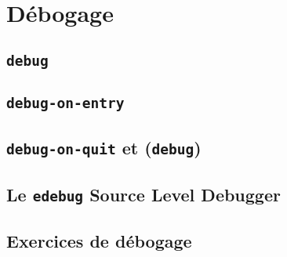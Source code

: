 \chapter{Débogage}

\section{\texttt{debug}}

\section{\texttt{debug-on-entry}}

\section{\texttt{debug-on-quit} et (\texttt{debug})}

\section{Le \texttt{edebug} Source Level Debugger}

\section{Exercices de débogage}
